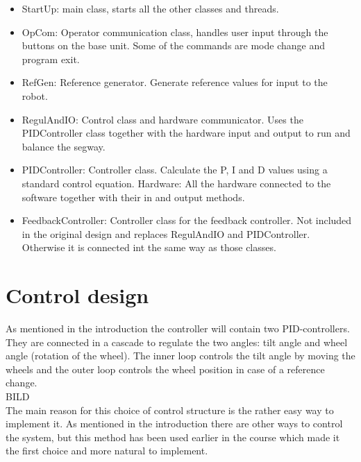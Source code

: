 \documentclass[a4paper]{article}
\begin{document}
\begin{itemize}
\item StartUp: main class, starts all the other classes and threads.
\item OpCom: Operator communication class, handles user input through the buttons on the base unit. Some of the commands are mode change and program exit.
\item RefGen: Reference generator. Generate reference values for input to the robot.
\item RegulAndIO: Control class and hardware communicator. Uses the PIDController class together with the hardware input and output to run and balance the segway.
\item PIDController: Controller class. Calculate the P, I and D values using a standard control equation.
Hardware: All the hardware connected to the software together with their in and output methods.
\item FeedbackController: Controller class for the feedback controller. Not included in the original design and replaces RegulAndIO and PIDController. Otherwise it is connected int the same way as those classes.
\end{itemize}

\section{Control design}
As mentioned in the introduction the controller will contain two PID-controllers. They are connected in a cascade to regulate the two angles: tilt angle and wheel angle (rotation of the wheel). The inner loop controls the tilt angle by moving the wheels and the outer loop controls the wheel position in case of a reference change.\\

BILD\\

The main reason for this choice of control structure is the rather easy way to implement it. As mentioned in the introduction there are other ways to control the system, but this method has been used earlier in the course which made it the first choice and more natural to implement. \\
\end{document}
